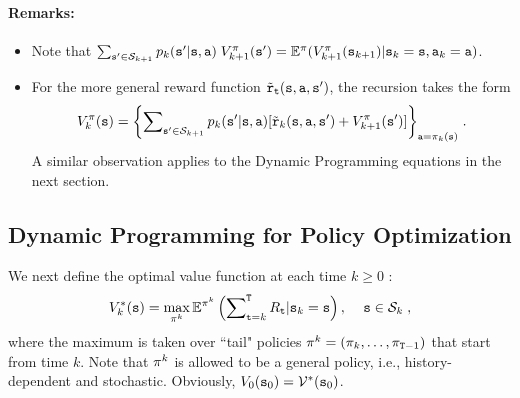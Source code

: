\paragraph{Remarks:}
\begin{itemize}
  \item Note that $\sum\nolimits_{{\tt s}' \in {\mathcal{S}_{k + 1}}} {{p_k}({\tt s}'|{\tt s},{\tt a})} \;V_{k + 1}^\pi ({\tt s}') = {\mathbb{E}^\pi }(V_{k + 1}^\pi ({{\tt s}_{k + 1}})|{{\tt s}_k} = {\tt s},{{\tt a}_k} = {\tt a})$.
  \item For the more general reward function ${\tilde {{\tt r}}_{\tt t}}({\tt s},{\tt a},{\tt s}')$, the recursion takes the form
                     \[V_k^\pi ({\tt s}) = {\left\{ {\sum\nolimits_{{\tt s}' \in {\mathcal{S}_{k + 1}}} {{p_k}({\tt s}'|{\tt s},{\tt a})} [{\tilde {{\tt r}}_k}({\tt s},{\tt a},{\tt s}') + V_{k + 1}^\pi ({\tt s}')]} \right\}_{{\tt a} = {\pi _k}({\tt s})}}\;.\]
                      A similar observation applies to the Dynamic Programming
equations in the next section.
\end{itemize}

\subsection{Dynamic Programming for Policy Optimization}

We next define the optimal value function at each time $k \ge 0$ :
\[
V_k^{*}({\tt s}) = \mathop {\max }\limits_{{\pi ^k}}
{\mathbb{E}^{{\pi ^k}}}\left( {\sum\nolimits_{{\tt t} = k}^{\tt T}
{{R_{\tt t}}|{{\tt s}_k} = {\tt s}} } \right),\quad \,{\tt s} \in
{\mathcal{S}_k} \;,
\]
where the maximum is taken over ``tail" policies ${\pi ^k} =
({\pi_k}, \ldots ,{\pi _{{\tt T} -1}})$ that start from
time $k$. Note that ${\pi ^k}$ is allowed to be a general
policy, i.e., history-dependent and stochastic. Obviously,
${V_0}({{\tt s}_0}) = {\mathcal{V}^*}({{\tt s}_0})$.

